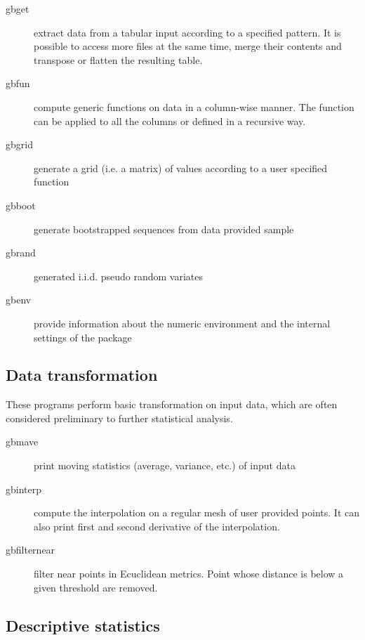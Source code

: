 \documentclass[11pt]{article}
\begin{document}
\begin{description}
\item[{gbget}] extract data from a tabular input according to a specified
pattern. It is possible to access more files at the same
time, merge their contents and transpose or flatten the
resulting table.

\item[{gbfun}] compute generic functions on data in a column-wise
manner. The function can be applied to all the columns or
defined in a recursive way.

\item[{gbgrid}] generate a grid (i.e. a matrix) of values according to a
user specified function

\item[{gbboot}] generate bootstrapped sequences from data provided sample

\item[{gbrand}] generated i.i.d. pseudo random variates

\item[{gbenv}] provide information about the numeric environment and the
internal settings of the package
\end{description}
\subsection{Data transformation}
\label{sec-1-2}

These programs perform basic transformation on input data, which are
often considered preliminary to further statistical analysis.


\begin{description}
\item[{gbmave}] print moving statistics (average, variance, etc.) of input
data
\end{description}


\begin{description}
\item[{gbinterp}] compute the interpolation on a regular mesh of user
provided points. It can also print first and second
derivative of the interpolation.

\item[{gbfilternear}] filter near points in Ecuclidean metrics. Point
whose distance is below a given threshold are
removed.
\end{description}
\subsection{Descriptive statistics}
\label{sec-1-3}
\end{document}
